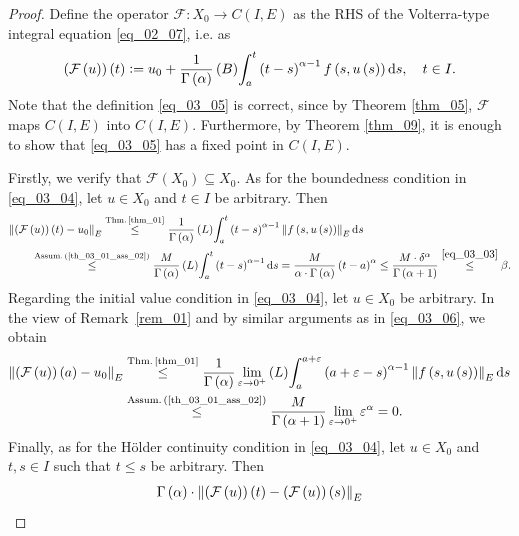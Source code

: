 \documentclass[reqno]{amsart}
\numberwithin{equation}{section}
\theoremstyle{definition}
\theoremstyle{remark}
\newcommand{\assumRef}[1]{\textrm{Assum.\,}\br{\textrm{\ref{#1}}}}
\newcommand{\Bint}[3]{\br{B}\!\displaystyle\int_{#1}^{#2}{#3}}
\newcommand{\br}[1]{\left(#1\right)}
\newcommand{\C}[2]{C\br{#1,#2}}
\newcommand{\defeq}{\vcentcolon=}
\newcommand{\ds}{\mathrm{d}s}
\newcommand{\eps}{\varepsilon}
\newcommand{\fF}{\mathcal{F}}
\newcommand{\leqText}[1]{\stackrel{#1}{\leq}}
\newcommand{\Lint}[3]{\br{L}\!\displaystyle\int_{#1}^{#2}{#3}}
\newcommand{\remarkRef}[1]{\textrm{Remark \,\ref{#1}}}
\newcommand{\st}{\!:}
\newcommand{\theoremRef}[1]{\textrm{Theorem \ref{#1}}}
\newcommand{\thmRef}[1]{\textrm{Thm.\,\ref{#1}}}
\begin{document}
\begin{proof}
	Define the operator $\fF\st{X}_0\rightarrow\C{I}{E}$ as the RHS of the Volterra-type integral equation \eqref{eq_02_07}, i.e. as
	\begin{equation}\label{eq_03_05}
		\br{\fF\br{u}}\br{t}\defeq{u}_0+\frac{1}{\Gamma\br{\alpha}}\Bint{a}{t}{\br{t-s}^{\alpha-1}f\br{s,u\br{s}}\ds},\quad{t}\in{I}.
	\end{equation}
	Note that the definition \eqref{eq_03_05} is correct, since by \theoremRef{thm_05}, $\fF$ maps $\C{I}{E}$ into $\C{I}{E}$. Furthermore, by \theoremRef{thm_09}, it is enough to show that \eqref{eq_03_05} has a fixed point in $\C{I}{E}$.
	
	Firstly, we verify that $\fF\br{X_0}\subseteq{X}_0$. As for the boundedness condition in \eqref{eq_03_04}, let $u\in{X}_0$ and $t\in{I}$ be arbitrary. Then
	\begin{equation}\label{eq_03_06}
		\begin{aligned}
			&\norm{\br{\fF\br{u}}\br{t}-u_0}_E\leqText{\thmRef{thm_01}}\frac{1}{\Gamma\br{\alpha}}\Lint{a}{t}{\br{t-s}^{\alpha-1}\norm{f\br{s,u\br{s}}}_E\,\ds}\\
			&\qquad\leqText{\assumRef{th_03_01_ass_02}}\frac{M}{\Gamma\br{\alpha}}\Lint{a}{t}{\br{t-s}^{\alpha-1}\ds}=\frac{M}{\alpha\cdot\Gamma\br{\alpha}}\br{t-a}^{\alpha}\leq\frac{M\cdot\delta^{\alpha}}{\Gamma\br{\alpha+1}}\leqText{\eqref{eq_03_03}}\beta.
		\end{aligned}
	\end{equation}
	Regarding the initial value condition in \eqref{eq_03_04}, let $u\in{X}_0$ be arbitrary. In the view of \remarkRef{rem_01} and by similar arguments as in \eqref{eq_03_06}, we obtain
	\begin{equation}\label{eq_03_07}
		\begin{aligned}
			\norm{\br{\fF\br{u}}\br{a}-u_0}_E&\leqText{\thmRef{thm_01}}\frac{1}{\Gamma\br{\alpha}}\lim_{\eps\rightarrow0^+}\Lint{a}{a+\eps}{\br{a+\eps-s}^{\alpha-1}\norm{f\br{s,u\br{s}}}_E\,\ds}\\
			&\leqText{\assumRef{th_03_01_ass_02}}\frac{M}{\Gamma\br{\alpha+1}}\lim_{\eps\rightarrow0^+}\eps^{\alpha}=0.
		\end{aligned}
	\end{equation}
	Finally, as for the Hölder continuity condition in \eqref{eq_03_04}, let $u\in{X}_0$ and $t,s\in{I}$ such that ${t}\leq{s}$ be arbitrary. Then
	\begin{equation*}
		\begin{aligned}
			\Gamma\br{\alpha}&\cdot\norm{\br{\fF\br{u}}\br{t}-\br{\fF\br{u}}\br{s}}_E\\

\end{aligned}
\end{equation*}
\end{proof}
\end{document}
